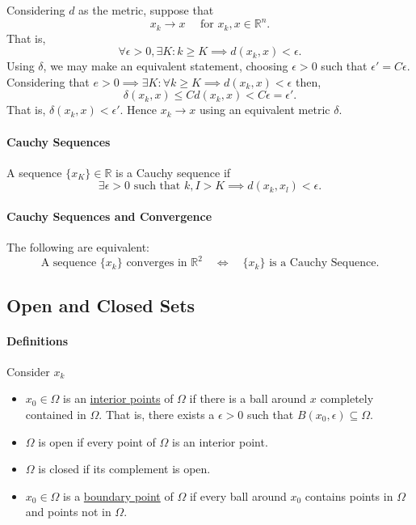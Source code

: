 \documentclass[12pt, letterpaper]{article}
\begin{document}
    Considering \(d\) as the metric, suppose that 
    \[x_k \to x\quad\text{ for } x_k, x \in\mathbb{R}^n.\]
    That is,
    \[\forall \epsilon > 0, \exists K : k \geq K \implies d(x_k, x) < \epsilon.\]
    Using \(\delta\), we may make an equivalent statement, choosing
    \(\epsilon > 0\) such that \(\epsilon' = C\epsilon\).
    Considering that \(e > 0 \implies \exists K : \forall k \geq K
    \implies d(x_k, x) < \epsilon\) then, 
    \[\delta (x_k, x) \leq Cd (x_k, x) < C\epsilon = \epsilon'.\]
    That is, \(\delta (x_k, x) < \epsilon'.\) Hence \(x_k \to x\)
    using an equivalent metric \(\delta\).

    \paragraph{Cauchy Sequences}
    A sequence \(\{x_K\}\in\mathbb{R}\) is a Cauchy sequence if
    \[
        \exists \epsilon > 0 \text{ such that } k,I > K 
        \implies d(x_k, x_l) < \epsilon.
    \]

    \paragraph{Cauchy Sequences and Convergence}
    The following are equivalent:
    \[
        \text{A sequence \(\{x_k\}\) converges in \(\mathbb{R}^2\)}
        \quad \Longleftrightarrow \quad
        \text{\(\{x_k\}\) is a Cauchy Sequence}.
    \]
    
    \subsection{Open and Closed Sets}

    \paragraph{Definitions}
    Consider \(x_k \)
    \begin{itemize}
        \item \(x_0\in\Omega\) is an \underline{interior points} of \(\Omega\) if there is a ball around \(x\) completely contained in \(\Omega\). That is, there exists a \(\epsilon > 0\) such that \(B(x_0, \epsilon) \subseteq \Omega\).
        \item  \(\Omega\) is open if every point of \(\Omega\) is an interior point.
        \item \(\Omega\) is closed if its complement is open.
        \item \(x_0\in\Omega\) is a \underline{boundary point} of \(\Omega\) if every ball around \(x_0\) contains points in \(\Omega\) and points not in \(\Omega\).
    \end{itemize}
\end{document}
